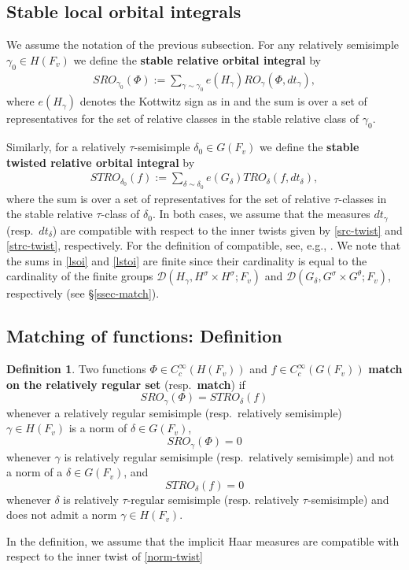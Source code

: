 \documentclass[12pt]{amsart}
\theoremstyle{remark}
\numberwithin{equation}{section}
\theoremstyle{definition}
\newtheorem{defn}[thm]{Definition}
\numberwithin{equation}{subsection}
\begin{document}
\subsection{Stable local orbital integrals} \label{ssec-st-loi}
We assume the notation of the previous subsection.
For any relatively semisimple $\gamma_0 \in H(F_v)$ we define the
 \textbf{stable relative orbital integral} by
\begin{align}
\label{lsoi} SRO_{\gamma_0}(\Phi):=\sum_{\gamma \sim
\gamma_0}
e(H_{\gamma})RO_{\gamma}(\Phi,dt_{\gamma}),
\end{align}where $e(H_{\gamma})$ denotes the Kottwitz sign as in \cite{KottSign} and the sum is over a set of representatives for the set of relative classes in the stable relative class of $\gamma_0$.

Similarly, for a relatively $\tau$-semisimple $\delta_0 \in G(F_v)$ we define the \textbf{stable twisted
relative orbital integral} by
\begin{align}
\label{lstoi}
STRO_{\delta_0}(f):=
\sum_{\delta \sim \delta_0}e(G_{\delta})TRO_{\delta}(f,dt_{\delta}),
\end{align} where the sum is over a set of representatives for the set of relative $\tau$-classes in the stable relative
$\tau$-class of $\delta_0$.  In both cases, we assume that the measures $dt_{\gamma}$ (resp.~$dt_{\delta}$)
are compatible with respect to the inner twists given by \eqref{src-twist} and \eqref{strc-twist}, respectively.
For the definition of compatible, see, e.g., \cite[p.~631]{KottTama}.  We note that the sums in \eqref{lsoi}
and \eqref{lstoi} are finite since their cardinality is equal to the
cardinality of the finite groups $\mathcal{D}(H_{\gamma},H^{\sigma} \times H^{\sigma};F_v)$ and
$\mathcal{D}(G_{\delta},G^{\sigma} \times G^{\theta};F_v)$,
respectively (see \S \ref{ssec-match}).

\subsection{Matching of functions: Definition} \label{ssec-matching}


\begin{defn} \label{defn-match} Two functions $\Phi \in C_c^{\infty}(H(F_v))$ and $f \in C_c^{\infty}(G(F_v))$
\textbf{match on the relatively regular set} (resp.~\textbf{match}) if
$$
SRO_{\gamma}(\Phi)=STRO_{\delta}(f)
$$
whenever a relatively regular semisimple (resp.~relatively semisimple)
$\gamma \in H(F_v)$ is a norm of $\delta \in G(F_v)$,
$$
SRO_{\gamma}(\Phi)=0
$$
whenever $\gamma$ is relatively regular semisimple (resp.~relatively semisimple) and not a norm of a $\delta \in G(F_v)$, and
$$
STRO_{\delta}(f)=0
$$
whenever $\delta$ is relatively $\tau$-regular semisimple (resp. relatively $\tau$-semisimple)
 and does not admit a norm $\gamma \in H(F_v)$.
\end{defn}
In the definition, we assume that the implicit Haar measures are compatible with respect to the inner twist of \eqref{norm-twist}
\end{document}
